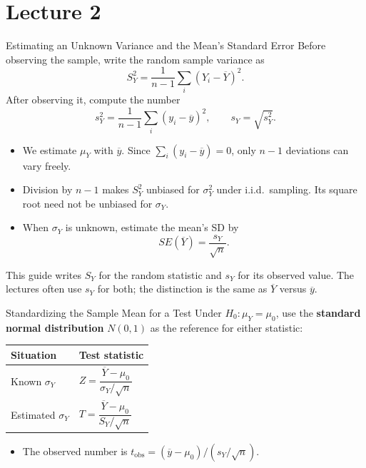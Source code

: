 \documentclass[10pt,aspectratio=169]{beamer}
\begin{document}
\section{Lecture 2}
\begin{frame}{Estimating an Unknown Variance and the Mean's Standard Error}
\small
Before observing the sample, write the random sample variance as
\[
S_Y^2=\frac1{n-1}\sum_i(Y_i-\overline Y)^2.
\]
After observing it, compute the number
\[
s_Y^2=\frac1{n-1}\sum_i(y_i-\overline y)^2,\qquad s_Y=\sqrt{s_Y^2}.
\]
\begin{itemize}
\item We estimate $\mu_Y$ with $\overline y$. Since $\sum_i(y_i-\overline y)=0$, only $n-1$ deviations can vary freely.
\item Division by $n-1$ makes $S_Y^2$ unbiased for $\sigma_Y^2$ under i.i.d.\ sampling. Its square root need not be unbiased for $\sigma_Y$.
\item When $\sigma_Y$ is unknown, estimate the mean's SD by
\[
\boxed{SE(\overline Y)=\frac{s_Y}{\sqrt n}}.
\]
\end{itemize}
This guide writes $S_Y$ for the random statistic and $s_Y$ for its observed value. The lectures often use $s_Y$ for both; the distinction is the same as $\overline Y$ versus $\overline y$.
\end{frame}

\begin{frame}{Standardizing the Sample Mean for a Test}
Under $H_0:\mu_Y=\mu_0$, use the \textbf{standard normal distribution} $N(0,1)$ as the reference for either statistic:
\begin{center}
\begin{tabular}{ll}
\toprule
Situation & Test statistic\\
\midrule
Known $\sigma_Y$ & $Z=\dfrac{\overline Y-\mu_0}{\sigma_Y/\sqrt n}$\\[14pt]
Estimated $\sigma_Y$ & $T=\dfrac{\overline Y-\mu_0}{S_Y/\sqrt n}$\\[8pt]
\bottomrule
\end{tabular}
\end{center}
\begin{itemize}
\item The observed number is $t_{\mathrm{obs}}=(\overline y-\mu_0)/(s_Y/\sqrt n)$.
\end{itemize}
\end{frame}
\end{document}
